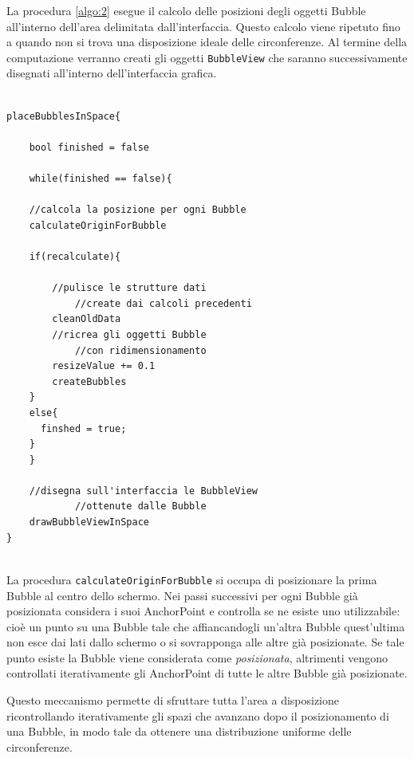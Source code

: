 La procedura \ref{algo:2} esegue il calcolo delle posizioni degli oggetti Bubble all'interno dell'area delimitata dall'interfaccia. Questo calcolo viene ripetuto fino a quando non si trova una disposizione ideale delle circonferenze. Al termine della computazione verranno creati gli oggetti \texttt{BubbleView} che saranno successivamente disegnati all'interno dell'interfaccia grafica.

\begin{lstlisting}[label=algo:2,caption=placeBubblesInSpace]

placeBubblesInSpace{
    
    bool finished = false
    
    while(finished == false){
    
	//calcola la posizione per ogni Bubble
	calculateOriginForBubble
	
	if(recalculate){
	
	    //pulisce le strutture dati 
			//create dai calcoli precedenti
	    cleanOldData 
	    //ricrea gli oggetti Bubble
			//con ridimensionamento
	    resizeValue += 0.1
	    createBubbles 
	}
	else{
	  finshed = true;
	}
    }
    
    //disegna sull'interfaccia le BubbleView
			//ottenute dalle Bubble
    drawBubbleViewInSpace
}


\end{lstlisting}


La procedura \texttt{calculateOriginForBubble} si occupa di posizionare la prima Bubble al centro dello schermo. Nei passi successivi per ogni Bubble già posizionata considera i suoi AnchorPoint e controlla se ne esiste uno utilizzabile: cioè un punto su una Bubble tale che affiancandogli un'altra Bubble quest'ultima non esce dai lati dallo schermo o si sovrapponga alle altre già posizionate. Se tale punto esiste la Bubble viene considerata come \emph{posizionata}, altrimenti vengono controllati iterativamente gli AnchorPoint di tutte le altre Bubble già posizionate.

Questo meccanismo permette di sfruttare tutta l'area a disposizione ricontrollando iterativamente gli spazi che avanzano dopo il posizionamento di una Bubble, in modo tale da ottenere una distribuzione uniforme delle circonferenze.

